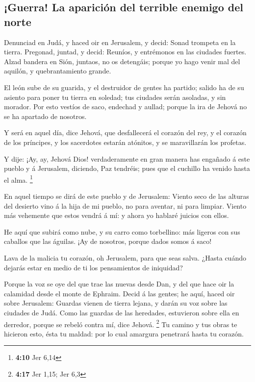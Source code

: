 \hypertarget{guerra-la-apariciuxf3n-del-terrible-enemigo-del-norte}{%
\subsection{¡Guerra! La aparición del terrible enemigo del
norte}\label{guerra-la-apariciuxf3n-del-terrible-enemigo-del-norte}}

 Denunciad en Judá, y haced oir en Jerusalem, y decid: Sonad
trompeta en la tierra. Pregonad, juntad, y decid: Reuníos, y entrémonos
en las ciudades fuertes.  Alzad bandera en Sión, juntaos, no
os detengáis; porque yo hago venir mal del aquilón, y quebrantamiento
grande.

 El león sube de su guarida, y el destruidor de gentes ha
partido; salido ha de su asiento para poner tu tierra en soledad; tus
ciudades serán asoladas, y sin morador.  Por esto vestíos de
saco, endechad y aullad; porque la ira de Jehová no se ha apartado de
nosotros.

 Y será en aquel día, dice Jehová, que desfallecerá el
corazón del rey, y el corazón de los príncipes, y los sacerdotes estarán
atónitos, y se maravillarán los profetas.

 Y dije: ¡Ay, ay, Jehová Dios! verdaderamente en gran
manera has engañado á este pueblo y á Jerusalem, diciendo, Paz tendréis;
pues que el cuchillo ha venido hasta el alma. \footnote{\textbf{4:10}
  Jer 6,14}

 En aquel tiempo se dirá de este pueblo y de Jerusalem:
Viento seco de las alturas del desierto vino á la hija de mi pueblo, no
para aventar, ni para limpiar.  Viento más vehemente que
estos vendrá á mí: y ahora yo hablaré juicios con ellos.

 He aquí que subirá como nube, y su carro como torbellino:
más ligeros con sus caballos que las águilas. ¡Ay de nosotros, porque
dados somos á saco!

 Lava de la malicia tu corazón, oh Jerusalem, para que seas
salva. ¿Hasta cuándo dejarás estar en medio de ti los pensamientos de
iniquidad?

 Porque la voz se oye del que trae las nuevas desde Dan, y
del que hace oir la calamidad desde el monte de Ephraim. 
Decid á las gentes; he aquí, haced oir sobre Jerusalem: Guardas vienen
de tierra lejana, y darán su voz sobre las ciudades de Judá.
 Como las guardas de las heredades, estuvieron sobre ella
en derredor, porque se rebeló contra mí, dice Jehová. \footnote{\textbf{4:17}
  Jer 1,15; Jer 6,3}  Tu camino y tus obras te hicieron
esto, ésta tu maldad: por lo cual amargura penetrará hasta tu corazón.

